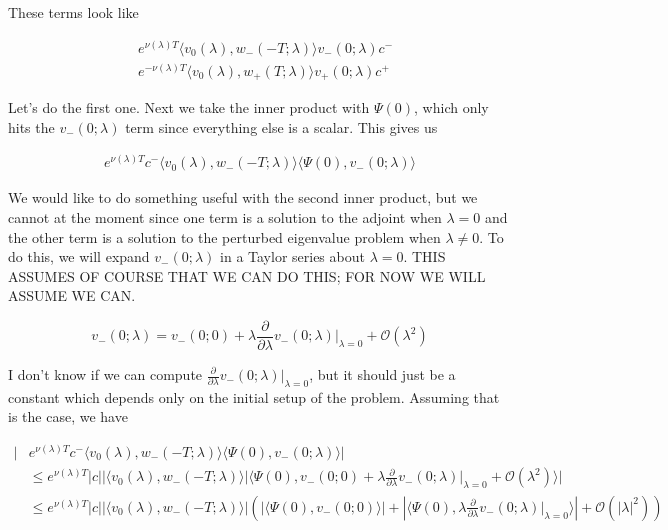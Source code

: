 \documentclass[12pt]{article}
\begin{document}
\begin{enumerate}
These terms look like

\begin{align*}
&e^{\nu(\lambda)T}  \langle v_0(\lambda), w_-(-T; \lambda) \rangle v_-(0; \lambda) c^- \\
&e^{-\nu(\lambda)T} \langle v_0(\lambda), w_+(T; \lambda) \rangle v_+(0; \lambda) c^+
\end{align*}

Let's do the first one. Next we take the inner product with $\Psi(0)$, which only hits the $v_-(0; \lambda)$ term since everything else is a scalar. This gives us 

\begin{align*}
e^{\nu(\lambda)T} c^- \langle v_0(\lambda), w_-(-T; \lambda) \rangle \langle \Psi(0), v_-(0; \lambda) \rangle
\end{align*}

We would like to do something useful with the second inner product, but we cannot at the moment since one term is a solution to the adjoint when $\lambda = 0$ and the other term is a solution to the perturbed eigenvalue problem when $\lambda \neq 0$. To do this, we will expand $v_-(0; \lambda)$ in a Taylor series about $\lambda = 0$. THIS ASSUMES OF COURSE THAT WE CAN DO THIS; FOR NOW WE WILL ASSUME WE CAN.

\[
v_-(0; \lambda) = v_-(0; 0) + \lambda \frac{\partial}{\partial \lambda}v_-(0; \lambda)\Big|_{\lambda = 0} + \mathcal{O}(\lambda^2)
\]

I don't know if we can compute $\frac{\partial}{\partial \lambda}v_-(0; \lambda)\Big|_{\lambda = 0}$, but it should just be a constant which depends only on the initial setup of the problem. Assuming that is the case, we have 

\begin{align*}
|&e^{\nu(\lambda)T} c^- \langle v_0(\lambda), w_-(-T; \lambda) \rangle \langle \Psi(0), v_-(0; \lambda) \rangle|\\
&\leq e^{\nu(\lambda)T}|c| |\langle v_0(\lambda), w_-(-T; \lambda) \rangle|\langle \Psi(0), v_-(0; 0) + \lambda \frac{\partial}{\partial \lambda}v_-(0; \lambda)\Big|_{\lambda = 0} + \mathcal{O}(\lambda^2) \rangle| \\
&\leq e^{\nu(\lambda)T}|c| |\langle v_0(\lambda), w_-(-T; \lambda) \rangle| \left( |\langle \Psi(0), v_-(0; 0) \rangle| +  |\langle \Psi(0), \lambda \frac{\partial}{\partial \lambda}v_-(0; \lambda)\Big|_{\lambda = 0} \rangle| + \mathcal{O}(|\lambda|^2) \right)
\end{align*}


\end{enumerate}
\end{document}
